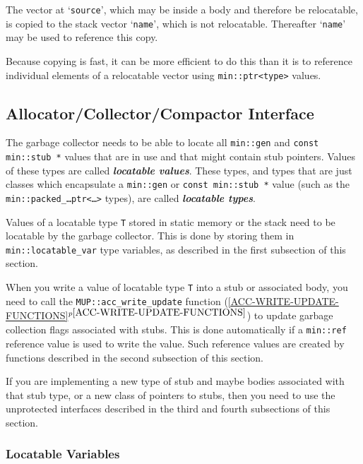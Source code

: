 \documentclass[12pt]{article}
\newcommand{\skey}[2]{{\bf \em #1#2}\index{#1}}
\newcommand{\itemref}[1]{\ref{#1}$^{p\pageref{#1}}$}
\newcommand{\EOL}{\penalty \exhyphenpenalty}
\newcommand{\BRACKETED}[1]{{\tt <#1>}}
\begin{document}
The vector at `{\tt source}', which may be inside a body and therefore
be relocatable, is copied to the stack vector `{\tt name}', which
is not relocatable.
Thereafter `{\tt name}' may be used to reference this copy.

Because copying is fast, it can be more efficient to do this than
it is to reference individual elements of a relocatable vector using
{\tt min::ptr<type>} values.

\subsection{Allocator/Collector/Compactor Interface}
\label{ACC-INTERFACE}

The garbage collector needs to be able to locate all
\verb|min::gen| and {\tt const min::\EOL stub~*} values
that are in use and that might contain stub pointers.
Values of these types are called \skey{locatable value}s.%
\label{LOCATABLE-VALUE}
These types, and types that are just classes which
encapsulate a {\tt min::\EOL gen} or {\tt const min::\EOL stub~*}
value (such as the {\tt min::packed\_\ldots ptr\BRACKETED{\ldots}} types),
are called \skey{locatable type}s.%
\label{LOCATABLE-TYPE}

Values of a locatable type {\tt T} stored in static memory or the stack
need to be locatable by the garbage collector.  This is done
by storing them in {\tt min::\EOL locatable\_\EOL var\TARG} type
variables, as described in the first subsection of this section.

When you write a value of locatable type {\tt T} into a stub or associated
body, you need to call the {\tt MUP::\EOL acc\_\EOL write\_\EOL update}
function (\itemref{ACC-WRITE-UPDATE-FUNCTIONS}) to update garbage
collection flags associated with stubs.
This is done automatically if a {\tt min::\EOL ref\TARG} reference value is
used to write the value.  Such reference values are created
by functions described in the second subsection of this section.

If you are implementing a new type of stub and maybe bodies
associated with that stub type, or a new class of pointers to stubs,
then you need to use the unprotected
interfaces described in the third and fourth subsections of this section.

\subsubsection{Locatable Variables}
\label{LOCATABLE-VARIABLES}
\end{document}

